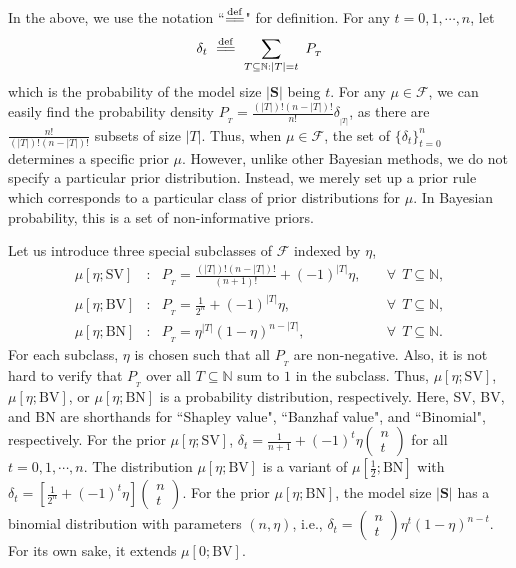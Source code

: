 \documentclass[a4paper,12pt]{article}
\newcommand{\eqdef}{\overset{\mathrm{def}}{=\joinrel=}}
\begin{document}
\noindent In the above, we use the notation ``$\eqdef$" for definition. 
For any $t=0, 1, \cdots, n$, let 
$$
\delta_t \ \eqdef \ \sum\limits_{T\subseteq \mathbb{N}: |T|=t} \ P_{_T}
$$
which is the probability of the model size $|{\mathbf S}|$ being $t$. 
For any $\mu \in \mathscr{F}$, we can easily find the probability density $P_{_T} = \frac{(|T|)!(n-|T|)!}{n!} \delta_{_{|T|}}$, as there are 
$\frac{n!}{(|T|)!(n-|T|)!}$ subsets of size $|T|$.
Thus, when $\mu \in \mathscr{F}$, the set of $\{ \delta_t \}_{t=0}^n$ determines a specific prior $\mu$.
However, unlike other Bayesian methods, we do not specify a particular prior distribution. 
Instead, we merely set up a prior rule which corresponds to a particular class of prior distributions for $\mu$.
In Bayesian probability, this is a set of non-informative priors.

Let us introduce three special subclasses of $\mathscr{F}$ indexed by $\eta$,
$$
\begin{array}{rcll}
\mu[\eta; \mathrm{SV}] 	&:& P_{_T} = \frac{(|T|)!(n-|T|)!}{(n+1)!} + (-1)^{|T|}\eta, \quad &\forall \ \ T\subseteq \mathbb{N}, \\

\mu[\eta; \mathrm{BV}] 	&:& P_{_T} = \frac{1}{2^n} + (-1)^{|T|} \eta, \quad & \forall \ \ T\subseteq \mathbb{N}, \\

\mu[\eta; \mathrm{BN}] 	&:& P_{_T} =  \eta^{|T|} (1-\eta)^{n-|T|}, \quad & \forall \ \ T\subseteq \mathbb{N}.
\end{array}
$$
For each subclass, $\eta$ is chosen such that  all $P_{_T}$ are non-negative. 
Also, it is not hard to verify that $P_{_T}$ over all $T\subseteq \mathbb{N}$ sum to $1$ in the subclass.
Thus, $\mu[\eta; \mathrm{SV}]$, $\mu[\eta;\mathrm{BV}]$, 
or $\mu[\eta; \mathrm{BN}]$ is a probability distribution, respectively.
Here,  SV, BV, and BN are shorthands for ``Shapley value", ``Banzhaf value", and ``Binomial", respectively.
For the prior $\mu[\eta; \mathrm{SV}]$, $\delta_t = \frac{1}{n+1} + (-1)^t \eta
\left (
\begin{array}{c}
n \\
t
\end{array}
\right )$ for all $t=0,1,\cdots, n$. 
The distribution $\mu[\eta; \mathrm{BV}]$ is a variant of $\mu[\frac{1}{2}; \mathrm{BN}]$ with
$\delta_t = \left [ \frac{1}{2^n}+(-1)^t \eta \right ]
\left (
\begin{array}{c}
n \\
t
\end{array}
\right ).
$
For the prior $\mu[\eta; \mathrm{BN}]$, the model size
$|\mathbf{S}|$ has a binomial distribution with parameters $(n,\eta)$, i.e., 
$\delta_t = 
\left (
\begin{array}{c}
n \\
t
\end{array}
\right )
\eta^t (1-\eta)^{n-t}
$.
For its own sake, it extends $\mu[0; \mathrm{BV}]$. 
\end{document}
